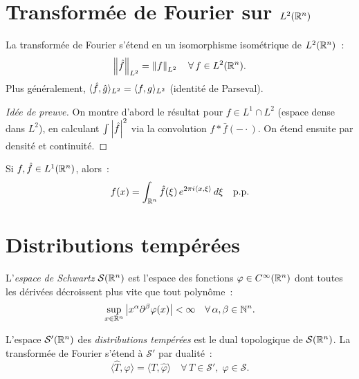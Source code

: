 \section{Transform\'ee de Fourier sur $L^2(\mathbb{R}^n)$}

\begin{theoreme}[Plancherel]
\label{thm:plancherel}
La transform\'ee de Fourier s'\'etend en un isomorphisme isom\'etrique de $L^2(\mathbb{R}^n)$~:
\[
    \left\| \hat{f} \right\|_{L^2} = \left\| f \right\|_{L^2} \quad \forall\, f \in L^2(\mathbb{R}^n).
\]
Plus g\'en\'eralement, $\langle \hat{f}, \hat{g} \rangle_{L^2} = \langle f, g \rangle_{L^2}$
(identit\'e de Parseval).
\end{theoreme}

\begin{proof}[Id\'ee de preuve]
On montre d'abord le r\'esultat pour $f \in L^1 \cap L^2$ (espace dense dans $L^2$),
en calculant $\int \left| \hat{f} \right|^2$ via la convolution $f * \bar{f}(-\cdot)$.
On \'etend ensuite par densit\'e et continuit\'e.
\end{proof}

\begin{theoreme}
Si $f, \hat{f} \in L^1(\mathbb{R}^n)$, alors~:
\[
    f(x) = \int_{\mathbb{R}^n} \hat{f}(\xi)\, e^{2\pi i \langle x, \xi \rangle} \, d\xi
    \quad \text{p.p.}
\]
\end{theoreme}

\section{Distributions temp\'er\'ees}

\begin{definition}
L'\emph{espace de Schwartz} $\mathcal{S}(\mathbb{R}^n)$ est l'espace des fonctions
$\varphi \in C^\infty(\mathbb{R}^n)$ dont toutes les d\'eriv\'ees d\'ecroissent plus vite
que tout polyn\^ome~:
\[
    \sup_{x \in \mathbb{R}^n} \left| x^\alpha \partial^\beta \varphi(x) \right| < \infty
    \quad \forall\, \alpha, \beta \in \mathbb{N}^n.
\]
\end{definition}

\begin{definition}
L'espace $\mathcal{S}'(\mathbb{R}^n)$ des \emph{distributions temp\'er\'ees} est le dual
topologique de $\mathcal{S}(\mathbb{R}^n)$. La transform\'ee de Fourier s'\'etend \`a
$\mathcal{S}'$ par dualit\'e~:
\[
    \langle \hat{T}, \varphi \rangle = \langle T, \hat{\varphi} \rangle
    \quad \forall\, T \in \mathcal{S}', \; \varphi \in \mathcal{S}.
\]
\end{definition}

